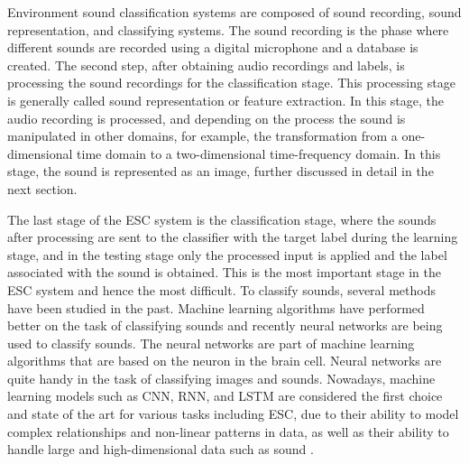 Environment sound classification systems are composed  of sound recording, sound representation, and classifying systems. The sound recording is the phase where different sounds are recorded using a digital microphone and a database is created. The second step, after obtaining audio recordings and labels, is processing the sound recordings for the classification stage. This processing stage is generally called sound representation or feature extraction. In this stage, the audio recording is processed, and depending on the process the sound is manipulated in other domains, for example, the transformation from a one-dimensional time domain to a two-dimensional time-frequency domain. In this stage, the sound is represented as an image, further discussed in detail in the next section. 

The last stage of the ESC system is the classification stage, where the sounds after processing are sent to the classifier with the target label during the learning stage, and in the testing stage only the processed input is applied and the label associated with the sound is obtained. This is the most important stage in the ESC system and hence the most difficult. To classify sounds, several methods have been studied in the past. Machine learning algorithms have performed better on the task of classifying sounds and recently neural networks are being used to classify sounds. The neural networks are part of machine learning algorithms that are based on the neuron in the brain cell. Neural networks are quite handy in the task of classifying images and sounds. Nowadays, machine learning models such as CNN, RNN, and LSTM are considered the first choice and state of the art for various tasks including ESC, due to their ability to model complex relationships and non-linear patterns in data, as well as their ability to handle large and high-dimensional data such as sound \cite{DCASE2020Workshop, DCASE2019Workshop, dcase2022, piczak2015environmental}.



